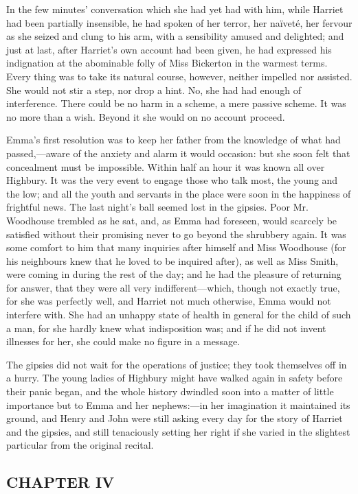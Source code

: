 In the few minutes' conversation which she had yet had with him, while Harriet had been partially insensible, he had spoken of her terror, her naïveté, her fervour as she seized and clung to his arm, with a sensibility amused and delighted; and just at last, after Harriet's own account had been given, he had expressed his indignation at the abominable folly of Miss Bickerton in the warmest terms. Every thing was to take its natural course, however, neither impelled nor assisted. She would not stir a step, nor drop a hint. No, she had had enough of interference. There could be no harm in a scheme, a mere passive scheme. It was no more than a wish. Beyond it she would on no account proceed.

Emma's first resolution was to keep her father from the knowledge of what had passed,---aware of the anxiety and alarm it would occasion: but she soon felt that concealment must be impossible. Within half an hour it was known all over Highbury. It was the very event to engage those who talk most, the young and the low; and all the youth and servants in the place were soon in the happiness of frightful news. The last night's ball seemed lost in the gipsies. Poor Mr. Woodhouse trembled as he sat, and, as Emma had foreseen, would scarcely be satisfied without their promising never to go beyond the shrubbery again. It was some comfort to him that many inquiries after himself and Miss Woodhouse (for his neighbours knew that he loved to be inquired after), as well as Miss Smith, were coming in during the rest of the day; and he had the pleasure of returning for answer, that they were all very indifferent---which, though not exactly true, for she was perfectly well, and Harriet not much otherwise, Emma would not interfere with. She had an unhappy state of health in general for the child of such a man, for she hardly knew what indisposition was; and if he did not invent illnesses for her, she could make no figure in a message.

The gipsies did not wait for the operations of justice; they took themselves off in a hurry. The young ladies of Highbury might have walked again in safety before their panic began, and the whole history dwindled soon into a matter of little importance but to Emma and her nephews:---in her imagination it maintained its ground, and Henry and John were still asking every day for the story of Harriet and the gipsies, and still tenaciously setting her right if she varied in the slightest particular from the original recital.

\subsection[chapter-iv-2]{\useURL[url42][][][]\from[url42]CHAPTER IV}


